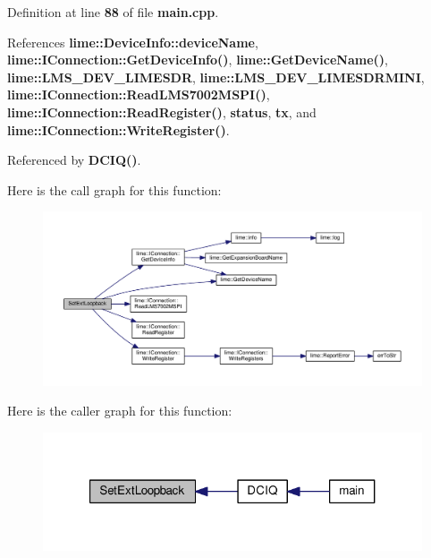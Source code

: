 Definition at line {\bf 88} of file {\bf main.\+cpp}.



References {\bf lime\+::\+Device\+Info\+::device\+Name}, {\bf lime\+::\+I\+Connection\+::\+Get\+Device\+Info()}, {\bf lime\+::\+Get\+Device\+Name()}, {\bf lime\+::\+L\+M\+S\+\_\+\+D\+E\+V\+\_\+\+L\+I\+M\+E\+S\+DR}, {\bf lime\+::\+L\+M\+S\+\_\+\+D\+E\+V\+\_\+\+L\+I\+M\+E\+S\+D\+R\+M\+I\+NI}, {\bf lime\+::\+I\+Connection\+::\+Read\+L\+M\+S7002\+M\+S\+P\+I()}, {\bf lime\+::\+I\+Connection\+::\+Read\+Register()}, {\bf status}, {\bf tx}, and {\bf lime\+::\+I\+Connection\+::\+Write\+Register()}.



Referenced by {\bf D\+C\+I\+Q()}.



Here is the call graph for this function\+:
\nopagebreak
\begin{figure}[H]
\begin{center}
\leavevmode
\includegraphics[width=350pt]{dd/d0b/mcu__program_2host__src_2main_8cpp_a2832a6e9527625a2c7947d9c31069ada_cgraph}
\end{center}
\end{figure}




Here is the caller graph for this function\+:
\nopagebreak
\begin{figure}[H]
\begin{center}
\leavevmode
\includegraphics[width=321pt]{dd/d0b/mcu__program_2host__src_2main_8cpp_a2832a6e9527625a2c7947d9c31069ada_icgraph}
\end{center}
\end{figure}


